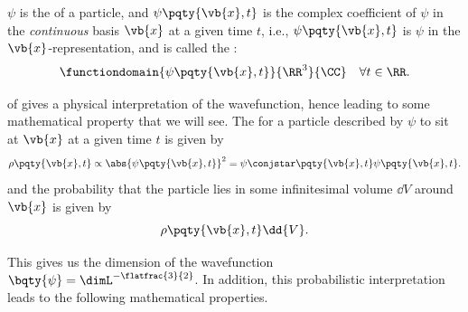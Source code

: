 \begin{definition}
    \(\psi\) is the  of a particle, and \(\psi \pqty{\vb{x}, t}\) is the complex coefficient of \(\psi\) in the \emph{continuous} basis \(\vb{x}\) at a given time \(t\), i.e., \(\psi\pqty{\vb{x}, t}\) is \(\psi\) in the \(\vb{x}\)-representation, and is called the :
    \begin{equation}
        \functiondomain{\psi\pqty{\vb{x}, t}}{\RR^3}{\CC} \quad \forall t \in \RR.
    \end{equation}
\end{definition}

 of  gives a physical interpretation of the wavefunction, hence leading to some mathematical property that we will see. The  for a particle described by \(\psi\) to sit at \(\vb{x}\) at a given time \(t\) is given by
\begin{equation}
    \rho\pqty{\vb{x}, t} \propto \abs{\psi\pqty{\vb{x}, t}}^2 = \psi\conjstar \pqty{\vb{x}, t} \psi\pqty{\vb{x}, t}.
\end{equation}
and the probability that the particle lies in some infinitesimal volume \(\dd{V}\) around \(\vb{x}\) is given by
\begin{equation}
    \rho\pqty{\vb{x}, t} \dd{V}.
\end{equation}

This gives us the dimension of the wavefunction \(\bqty{\psi} = \dimL^{-\flatfrac{3}{2}}\). In addition, this probabilistic interpretation leads to the following mathematical properties.

